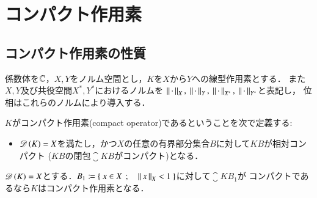 \chapter{コンパクト作用素}
\section{コンパクト作用素の性質}
	係数体を$\mathbb{C}$，$X,Y$をノルム空間とし，$K$を$X$から$Y$への線型作用素とする．
	また$X,Y$及び共役空間$X^*,Y^*$におけるノルムを
	$\Norm{\cdot}{X},\ \Norm{\cdot}{Y},\ \Norm{\cdot}{X^*},\ \Norm{\cdot}{Y^*}$と表記し，
	位相はこれらのノルムにより導入する．
	
	\begin{screen}
		\begin{dfn}[コンパクト作用素]
			$K$がコンパクト作用素(compact operator)であるということを次で定義する:
			\begin{itemize}
				\item $\Dom{K} = X$を満たし，かつ$X$の任意の有界部分集合$B$に対して$KB$が相対コンパクト
					($KB$の閉包$\closure{KB}$がコンパクト)となる．
			\end{itemize}
		\end{dfn}
	\end{screen}
	
	\begin{screen}
		\begin{lem}[コンパクト作用素となるための十分条件の一つ]
			$\Dom{K} = X$とする．$B_1 \coloneqq \left\{\ x \in X\ \, ; \quad \left\|\, x\, \right\|_{X} < 1\ \right\}$に対して$\closure{KB_1}$が
			コンパクトであるなら$K$はコンパクト作用素となる．
			\label{lem:unit_ball_and_compact_operator}
		\end{lem}
	\end{screen}
	
